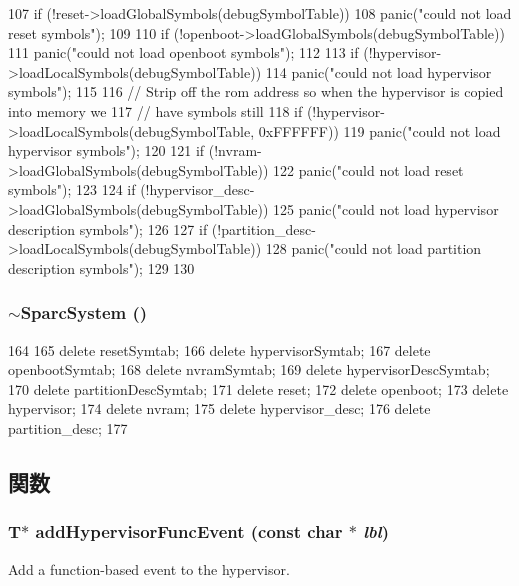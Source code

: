 \begin{DoxyCode}
{107     if (!reset->loadGlobalSymbols(debugSymbolTable))
108         panic("could not load reset symbols\n");
109 
110     if (!openboot->loadGlobalSymbols(debugSymbolTable))
111         panic("could not load openboot symbols\n");
112 
113     if (!hypervisor->loadLocalSymbols(debugSymbolTable))
114         panic("could not load hypervisor symbols\n");
115 
116     // Strip off the rom address so when the hypervisor is copied into memory we
117     // have symbols still
118     if (!hypervisor->loadLocalSymbols(debugSymbolTable, 0xFFFFFF))
119         panic("could not load hypervisor symbols\n");
120 
121     if (!nvram->loadGlobalSymbols(debugSymbolTable))
122         panic("could not load reset symbols\n");
123 
124     if (!hypervisor_desc->loadGlobalSymbols(debugSymbolTable))
125         panic("could not load hypervisor description symbols\n");
126 
127     if (!partition_desc->loadLocalSymbols(debugSymbolTable))
128         panic("could not load partition description symbols\n");
129 
130 }
\end{DoxyCode}
\hypertarget{classSparcSystem_aa7d91656538eac7a14b2aa0475059070}{
\subsubsection[{$\sim$SparcSystem}]{\setlength{\rightskip}{0pt plus 5cm}$\sim${\bf SparcSystem} ()}}
\label{classSparcSystem_aa7d91656538eac7a14b2aa0475059070}



\begin{DoxyCode}
164 {
165     delete resetSymtab;
166     delete hypervisorSymtab;
167     delete openbootSymtab;
168     delete nvramSymtab;
169     delete hypervisorDescSymtab;
170     delete partitionDescSymtab;
171     delete reset;
172     delete openboot;
173     delete hypervisor;
174     delete nvram;
175     delete hypervisor_desc;
176     delete partition_desc;
177 }
\end{DoxyCode}


\subsection{関数}
\hypertarget{classSparcSystem_aeac22b2a8ad8eb00deb0c28b42437633}{
\subsubsection[{addHypervisorFuncEvent}]{\setlength{\rightskip}{0pt plus 5cm}T$\ast$ addHypervisorFuncEvent (const char $\ast$ {\em lbl})}}
\label{classSparcSystem_aeac22b2a8ad8eb00deb0c28b42437633}
Add a function-\/based event to the hypervisor. 


